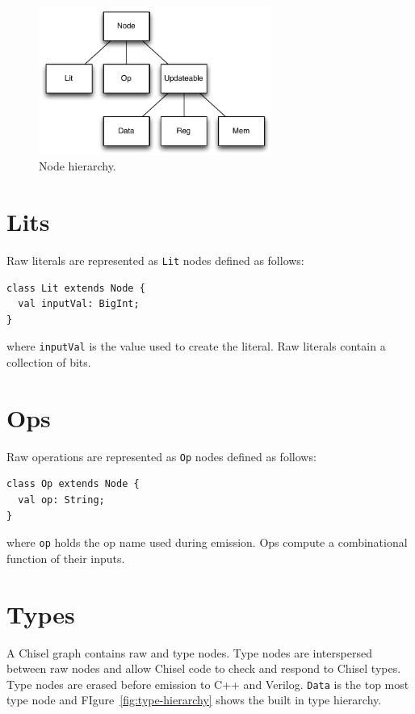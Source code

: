 \documentclass[10pt,twocolumn]{article}
\def\code#1{{\small\tt #1}}
\begin{document}
\begin{figure}[h]
\centering
\includegraphics[width=3in]{figs/node-hierarchy.pdf}
\caption{Node hierarchy.}
\label{fig:node-hierarchy}
\end{figure}

\section{Lits}

Raw literals are represented as \code{Lit} nodes defined as follows:

\begin{lstlisting}
class Lit extends Node {
  val inputVal: BigInt;
}
\end{lstlisting}

\noindent
where \code{inputVal} is the value used to create the literal.  
Raw literals contain a collection of bits.



\section{Ops}

Raw operations are represented as \code{Op} nodes defined as follows:

\begin{lstlisting}
class Op extends Node {
  val op: String;
}
\end{lstlisting}

\noindent
where \code{op} holds the op name used during emission.  
Ops compute a combinational function of their inputs.

\section{Types}

A Chisel graph contains raw and type nodes.  Type nodes are
interspersed between raw nodes and allow Chisel code to
check and respond to Chisel types.  Type nodes are erased before
emission to C++ and Verilog.  \code{Data} is the top most type node
and FIgure~\ref{fig:type-hierarchy} shows the built in type hierarchy.
\end{document}
